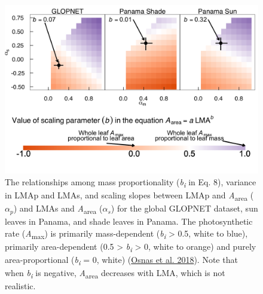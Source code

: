 \documentclass[
  12pt,
]{article}
\providecommand{\DIFaddbeginFL}{} %
\providecommand{\DIFaddendFL}{} %
\providecommand{\DIFdelbeginFL}{} %
\providecommand{\DIFdelendFL}{} %
\newcommand{\DIFscaledelfig}{0.5}
\newlength{\DIFdelgraphicswidth} %
\newlength{\DIFdelgraphicsheight} %
\newcommand{\DIFaddincludegraphics}[2][]{{\color{blue}\fbox{\DIFOincludegraphics[#1]{#2}}}} %
\newcommand{\DIFdelincludegraphics}[2][]{%
\sbox{\DIFdelgraphicsbox}{\DIFOincludegraphics[#1]{#2}}%
\settoboxwidth{\DIFdelgraphicswidth}{\DIFdelgraphicsbox} %
\settoboxtotalheight{\DIFdelgraphicsheight}{\DIFdelgraphicsbox} %
\scalebox{\DIFscaledelfig}{%
\parbox[b]{\DIFdelgraphicswidth}{\usebox{\DIFdelgraphicsbox}\\[-\baselineskip] \rule{\DIFdelgraphicswidth}{0em}}\llap{\resizebox{\DIFdelgraphicswidth}{\DIFdelgraphicsheight}{%
\setlength{\unitlength}{\DIFdelgraphicswidth}%
\begin{picture}(1,1)%
\thicklines\linethickness{2pt} %
{\color[rgb]{1,0,0}\put(0,0){\framebox(1,1){}}}%
{\color[rgb]{1,0,0}\put(0,0){\line( 1,1){1}}}%
{\color[rgb]{1,0,0}\put(0,1){\line(1,-1){1}}}%
\end{picture}%
}\hspace*{3pt}}} %
} %
\DeclareRobustCommand{\DIFaddbeginFL}{\DIFOaddbeginFL \let\includegraphics\DIFaddincludegraphics} %
\DeclareRobustCommand{\DIFaddendFL}{\DIFOaddendFL \let\includegraphics\DIFOincludegraphics} %
\DeclareRobustCommand{\DIFdelbeginFL}{\DIFOdelbeginFL \let\includegraphics\DIFdelincludegraphics} %
\DeclareRobustCommand{\DIFdelendFL}{\DIFOaddendFL \let\includegraphics\DIFOincludegraphics} %
\begin{document}
\begin{figure}
\DIFdelbeginFL %
\DIFdelendFL \DIFaddbeginFL \hypertarget{fig:massplt}{%
\centering
\includegraphics{../figs/mass_prop4.png}
\caption{The relationships among mass proportionality (\emph{b\textsubscript{i}} in Eq. 8), variance in LMAp and LMAs, and scaling slopes between LMAp and \emph{A}\textsubscript{area} (\(\alpha_p\)) and LMAs and \emph{A}\textsubscript{area} (\(\alpha_s\)) for the global GLOPNET dataset, sun leaves in Panama, and shade leaves in Panama.
The photosynthetic rate (\emph{A}\textsubscript{max}) is primarily mass-dependent (\emph{b\textsubscript{i}} \textgreater{} 0.5, white to blue), primarily area-dependent (0.5 \textgreater{} \emph{b\textsubscript{i}} \textgreater{} 0, white to orange) and purely area-proportional (\emph{b\textsubscript{i}} = 0, white) (\protect\hyperlink{ref-Osnas2018}{Osnas et al. 2018}).
Note that when \emph{b\textsubscript{i}} is negative, \emph{A}\textsubscript{area} decreases with LMA, which is not realistic.}\label{fig:massplt}
}
\DIFaddendFL \end{figure}
\end{document}
